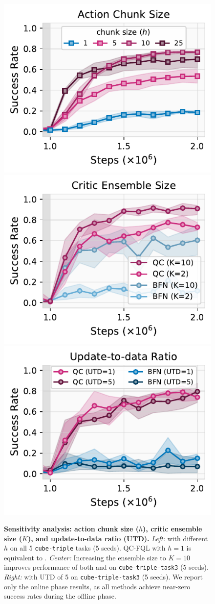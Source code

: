 \begin{figure}[t]
    \includegraphics[width=0.33\linewidth]{figures/ac-size.pdf} %
    \includegraphics[width=0.33\linewidth]{figures/10qs.pdf} 
    \includegraphics[width=0.33\linewidth]{figures/utd.pdf} %
    \caption{\footnotesize \textbf{Sensitivity analysis: action chunk size ($h$), critic ensemble size ($K$), and update-to-data ratio (UTD).} \emph{Left:}  with different $h$ on all 5 \texttt{cube-triple} tasks (5 seeds). QC-FQL with $h=1$ is equivalent to . \emph{Center:} Increasing the ensemble size to $K=10$ improves performance of both  and  on \texttt{cube-triple-task3} (5 seeds). \emph{Right:}  with UTD of 5 on \texttt{cube-triple-task3} (5 seeds). We report only the online phase results, as all methods achieve near-zero success rates during the offline phase.}
    \label{fig:sensitivity}
\end{figure}
